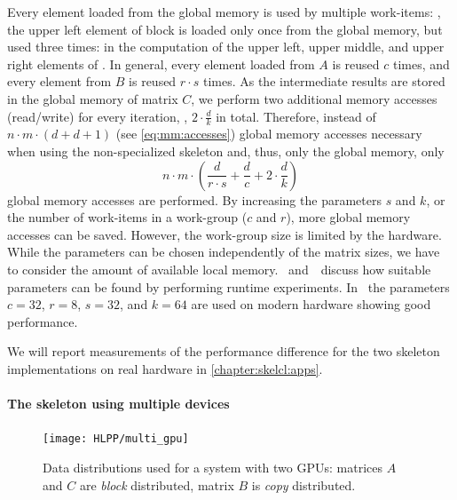 Every element loaded from the global memory is used by multiple work-items:
\eg, the upper left element of block  is loaded only once from the global memory, but used three times:
in the computation of the upper left, upper middle, and upper right elements of .
In general, every element loaded from $A$ is reused $c$ times, and every element from $B$ is reused $r\cdot s$ times.
As the intermediate results are stored in the global memory of matrix $C$, we perform two additional memory accesses (read/write) for every iteration, \ie, $2\cdot \frac{d}{k}$ in total.
Therefore, instead of $n\cdot m\cdot (d + d + 1)$ (see \autoref{eq:mm:accesses}) global memory accesses necessary when using the non-specialized skeleton and, thus, only the global memory, only
\begin{equation}
  n\cdot m\cdot (\frac{d}{r\cdot s} + \frac{d}{c} + 2\cdot \frac{d}{k})
\end{equation}
global memory accesses are performed.
By increasing the parameters $s$ and $k$, or the number of work-items in a work-group ($c$ and $r$), more global memory accesses can be saved.
However, the work-group size is limited by the \GPU hardware.
While the parameters can be chosen independently of the matrix sizes, we have to consider the amount of available local memory.
\cite{Friese2013}~and~\cite{SarjeAl2013}~discuss how suitable parameters can be found by performing runtime experiments.
In~\cite{Friese2013} the parameters $c = 32$, $r=8$, $s=32$, and $k=64$ are used on modern \GPU hardware showing good performance.

We will report measurements of the performance difference for the two skeleton implementations on real hardware in \autoref{chapter:skelcl:apps}.

\paragraph{The \allpairs skeleton using multiple devices}
\label{sec:allpairs:multi_gpu}
\begin{figure}[b]
  \centering
  \texttt{[image: HLPP/multi\_gpu]}
  \caption{Data distributions used for a system with two GPUs: matrices $A$ and $C$ are \emph{block} distributed, matrix $B$ is \emph{copy} distributed.}
  \label{fig:multi_gpu}
\end{figure}

